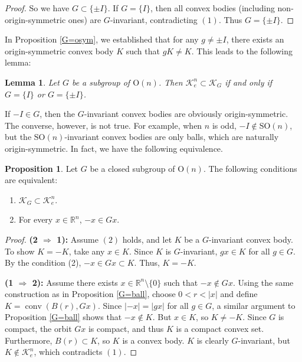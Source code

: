 \documentclass[12pt, reqno]{amsart}
\newtheorem{lemma}[theorem]{Lemma}
\theoremstyle{definition}
\newtheorem{proposition}[theorem]{Proposition}
\theoremstyle{remark}
\numberwithin{equation}{section}
\newcommand{\Rn}{\mathbb{R}^{n}}
\newcommand{\On}{\mathrm{O}(n)}
\newcommand{\KG}{\mathcal{K}_{G}}
\begin{document}
\begin{proof}
		 So we have $G \subset \{\pm I\}$. 
		If $G = \{I\}$, then all convex bodies (including non-origin-symmetric ones) are $G$-invariant, 
		contradicting  $(1)$. Thus $G = \{\pm I\}$.
	\end{proof}



		
	
	
	In Proposition \ref{G=osym}, we established that for any $g \neq \pm I$, there exists an origin-symmetric convex body $K$ such that $gK \neq K$. This leads to the following lemma:
	
	
	
\begin{lemma}

	Let $G$ be a subgroup of  $\On$. Then $ \mathcal{K}^{n}_{e}\subset \KG$ if and only if $G=\{I\}$ or $G=\{\pm I\}$.

\end{lemma}
	
If $-I \in G$, then the $G$-invariant convex bodies are obviously origin-symmetric. The converse, however, is not true. For example, when $n$ is odd, $-I \notin \mathrm{SO}(n)$, but the $\mathrm{SO}(n)$-invariant convex bodies are only balls, which are naturally origin-symmetric. In fact, we have the following equivalence.
	
	
		\begin{proposition} \label{Gsub osym}
			Let \(G\) be a closed subgroup of \(\On\). The following conditions are equivalent:
			\begin{enumerate}
				\item $\KG \subset \mathcal{K}^{n}_{e}$.
				\item For every  \(x \in \Rn \),  \(-x \in Gx\).
			\end{enumerate}
		\end{proposition}

	\begin{proof}
			\noindent\textbf{(2 $\Rightarrow$ 1):} 
		Assume $(2)$ holds, and let \(K\) be a \(G\)-invariant convex body. To show \(K = -K\), take any \(x \in K\).  Since $K$ is $G$-invariant, \(gx \in K\) for all \(g \in G\).   By the  condition (2), \(-x \in Gx \subset K\).  Thus, \(K = -K\).
		
		\noindent\textbf{(1 $\Rightarrow$ 2):} 
		Assume there exists \(x \in \Rn\setminus \{0\}\) such that $-x \notin Gx $. Using the same construction as in Proposition \ref{G=ball}, choose $0 < r < |x|$ and define  
		$K = \operatorname{conv}(B(r), Gx)$.  Since $|-x|=|gx|$ for all $g\in G$, a similar argument to Proposition \ref{G=ball} shows that
		 $-x \notin K$.  But $x\in K$, so $K\neq -K$.
		Since $G$ is compact,  
		the orbit $Gx$ is compact, and thus $K$ is a compact convex set. Furthermore,  $B(r)\subset K$, so $K$ is a convex body. $K$ is clearly $G$-invariant, but $K \notin \mathcal{K}^{n}_{e}$, which contradicts $
		(1)$.
		
	\end{proof}
	
\end{document}
